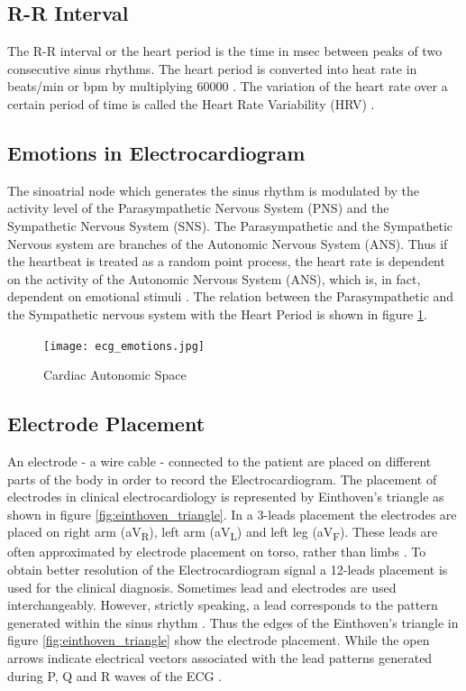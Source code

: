 \subsection{R-R Interval}
\label{sec:rrinterval}
The R-R interval or the heart period is the time in msec between peaks of two consecutive sinus rhythms. The heart period is converted into heat rate in beats/min or bpm by multiplying 60000 \cite{cacioppo_cardiovascular_2016_p_183_216}. The variation of the heart rate over a certain period of time is called the Heart Rate Variability (HRV) \cite{noauthor_what_2017}.

\subsection{Emotions in Electrocardiogram}
The sinoatrial node which generates the sinus rhythm is modulated by the activity level of the Parasympathetic Nervous System (PNS) and the Sympathetic Nervous System (SNS). The Parasympathetic and the Sympathetic Nervous system are branches of the Autonomic Nervous System (ANS). Thus if the heartbeat is treated as a random point process, the heart rate is dependent on the activity of the Autonomic Nervous System (ANS), which is, in fact, dependent on emotional stimuli \cite{kim_emotion_2004}. The relation between the Parasympathetic and the Sympathetic nervous system with the Heart Period is shown in figure \ref{fig:ecg_emotions}.

\begin{figure}
    \centering
    \texttt{[image: ecg\_emotions.jpg]}
    \caption{Cardiac Autonomic Space \cite{cacioppo_cardiovascular_2016_p_183_216}}
    \label{fig:ecg_emotions}
\end{figure}

\subsection{Electrode Placement} 
\label{sec:einthoven} An electrode - a wire cable - connected to the patient are placed on different parts of the body in order to record the Electrocardiogram. The placement of electrodes in clinical electrocardiology is represented by Einthoven's triangle as shown in figure \ref{fig:einthoven_triangle}. In a 3-leads placement the electrodes are placed on right arm (aV\textsubscript{R}), left arm (aV\textsubscript{L}) and left leg (aV\textsubscript{F}). These leads are often approximated by electrode placement on torso, rather than limbs \cite{cacioppo_cardiovascular_2016_p_183_216}. To obtain better resolution of the Electrocardiogram signal a 12-leads placement is used for the clinical diagnosis. Sometimes lead and electrodes are used interchangeably. However, strictly speaking, a lead corresponds to the pattern generated within the sinus rhythm \cite{hampton_ecg_2013}. Thus the edges of the Einthoven's triangle in figure \ref{fig:einthoven_triangle} show the electrode placement. While the open arrows indicate electrical vectors associated with the lead patterns generated during P, Q and R waves of the ECG \cite{cacioppo_cardiovascular_2016_p_183_216}.

